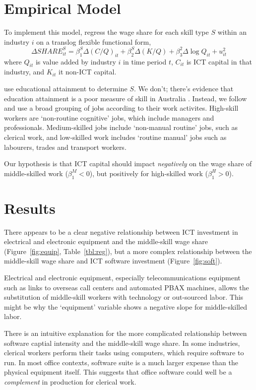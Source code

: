 \documentclass[a4paper]{article}
\begin{document}
\section{Empirical Model}

To implement this model, \citet{Michaels2010} regress the wage share for each skill type $S$ within an industry $i$ on a translog flexible functional form,
\begin{equation}
  \Delta SHARE^S_{it} = \beta^S_1\Delta(C/Q)_{it} + \beta^S_2\Delta(K/Q) + \beta^2_3\Delta\log Q_{it} + u^2_{it}
\end{equation}
where $Q_{it}$ is value added by industry $i$ in time period $t$, $C_{it}$ is ICT capital in that industry, and $K_{it}$ it non-ICT capital. 

\citet{Michaels2010} use educational attainment to determine $S$. We don't; there's evidence that education attainment is a poor measure of skill in Australia \citep{Coelli2009}. Instead, we follow \citep{Goos2007} and use a broad grouping of jobs according to their work activites. High-skill workers are `non-routine cognitive' jobs, which include managers and professionals. Medium-skilled jobs include `non-manual routine' jobs, such as clerical work, and low-skilled work includes `routine manual' jobs such as labourers, trades and transport workers.

Our hypothesis is that ICT capital should impact {\em negatively} on the wage share of middle-skilled work ($\beta_1^M<0$), but positively for high-skilled work ($\beta_1^H>0$).

\section{Results}

There appears to be a clear negative relationship between ICT investment in electrical and electronic equipment and the middle-skill wage share (Figure~\ref{fig:equip}, Table~\ref{tbl:reg}), but a more complex relationship between the middle-skill wage share and ICT software investment (Figure~\ref{fig:soft}).

Electrical and electronic equipment, especially telecommunications equipment such as links to overseas call centers and automated PBAX machines, allows the substitution of middle-skill workers with technology or out-sourced labor. This might be why the `equipment' variable shows a negative slope for middle-skilled labor.

There is an intuitive explanation for the more complicated relationship between software captial intensity and the middle-skill wage share. In some industries, clerical workers perform their tasks using computers, which require software to run. In most office contexts, software suite is a much larger expense than the physical equipment itself. This suggests that office software could well be a {\em complement} in production for clerical work.
\end{document}
